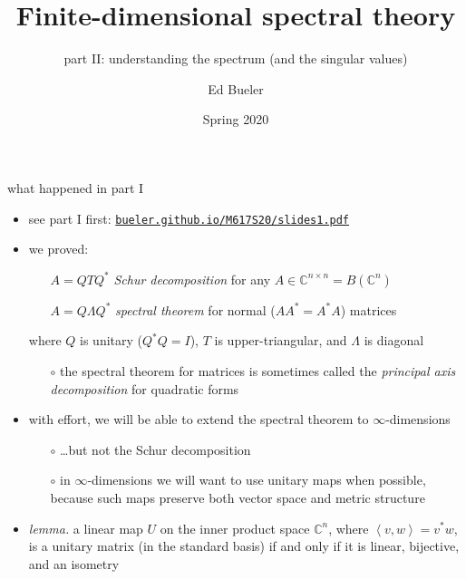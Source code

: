 \documentclass[10pt,hyperref]{beamer}
\title[Finite-dimensional spectral theory II]{Finite-dimensional spectral theory}
\subtitle{part II: understanding the spectrum (and the singular values)}
\author{Ed Bueler}
\institute[MATH 617]{MATH 617 Functional Analysis}
\date{Spring 2020}
\newcommand{\CC}{\mathbb{C}}
\newcommand{\ip}[2]{\left<#1,#2\right>}
\begin{document}
\beamertemplatenavigationsymbolsempty


\begin{frame}
  \maketitle
\end{frame}


\begin{frame}{what happened in part I}

\begin{itemize}
\item see part I first: \quad \href{http://bueler.github.io/M617S20/slides1.pdf}{\texttt{bueler.github.io/M617S20/slides1.pdf}}
\item we proved:
    \begin{itemize}
    \item[] $A = Q T Q^*$ \quad \emph{Schur decomposition} \quad for any $A \in \CC^{n\times n}=B(\CC^n)$
    \item[] $A = Q \Lambda Q^*$ \quad \emph{spectral theorem} \quad for normal ($AA^*=A^*A$) matrices
    \end{itemize}
where $Q$ is unitary ($Q^*Q=I$), $T$ is upper-triangular, and $\Lambda$ is diagonal
    \begin{itemize}
    \item[$\circ$] the spectral theorem for matrices is sometimes called the \emph{principal axis decomposition} for quadratic forms
    \end{itemize}
\item with effort, we will be able to extend the spectral theorem to $\infty$-dimensions
    \begin{itemize}
    \item[$\circ$] \dots but not the Schur decomposition
    \item[$\circ$] in $\infty$-dimensions we will want to use unitary maps when possible, because such maps preserve both vector space and metric structure
    \end{itemize}

\bigskip
\small
\item \emph{lemma.} a linear map $U$ on the inner product space $\CC^n$, where $\ip{v}{w}=v^*w$, is a unitary matrix (in the standard basis) if and only if it is linear, bijective, and an isometry

\end{itemize}
\end{frame}
\end{document}
